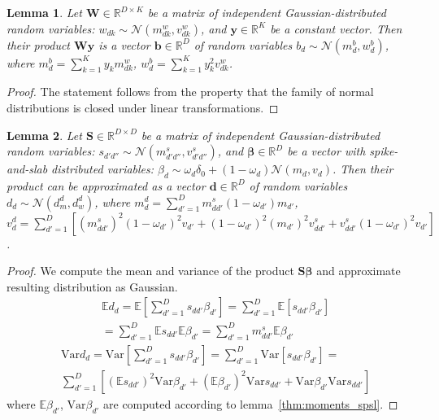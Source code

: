 \documentclass[letterpaper]{article}
\newtheorem{lemma}{Lemma}
\begin{document}
 \begin{lemma}
 \label{thm:matrix_const}
 Let $\mathbf{W} \in \mathbb{R}^{D \times K}$ be a matrix of independent Gaussian-distributed random variables: $w_{dk} \sim \mathcal{N}(m^w_{dk}, v^w_{dk})$, and $\mathbf{y} \in \mathbb{R}^K$ be a constant vector. Then their product $\mathbf{W} \mathbf{y}$ is a vector $\mathbf{b} \in \mathbb{R}^{D}$ of random variables $b_d \sim \mathcal{N}(m^b_d, w^b_d)$, where $m^b_d = \sum_{k=1}^Ky_k m^w_{dk}$, $w^b_d = \sum_{k=1}^Ky_k^2v^w_{dk}$. 
 \end{lemma}
 \begin{proof}
 	The statement follows from the property that the family of normal distributions is closed under linear transformations.
 \end{proof}
 
  \begin{lemma}
  \label{thm:matrix_vector}
 Let $\mathbf{S} \in \mathbb{R}^{D \times D}$ be a matrix of independent Gaussian-distributed random variables: $s_{d'd''} \sim \mathcal{N}(m^s_{d'd''}, v^s_{d'd''})$, and $\boldsymbol\beta \in \mathbb{R}^D$ be a vector with spike-and-slab distributed variables: $\beta_d \sim \omega_d \delta_0 + (1 - \omega_d)\mathcal{N}(m_d, v_d)$. Then their product can be approximated as a vector $\mathbf{d} \in \mathbb{R}^{D}$ of random variables $d_d \sim \mathcal{N}(d^d_m, d^d_w)$, where $m^d_d = \sum_{d'=1}^D m^s_{dd'}(1-\omega_{d'})m_{d'}$, $v^d_d = \sum_{d'=1}^D [(m^s_{dd'})^2(1-\omega_{d'})^2v_{d'} + (1-\omega_{d'})^2(m_{d'})^2v^s_{dd'} + v^s_{dd'}(1-\omega_{d'})^2v_{d'}]$.
 \end{lemma}
 \begin{proof}
 	We compute the mean and variance of the product $\mathbf{S}\boldsymbol\beta$ and approximate resulting distribution as Gaussian.
\begin{align}
	&\mathbb{E}d_d = \mathbb{E} \left[\sum_{d'=1}^D s_{dd'}\beta_{d'}\right] =  \sum_{d'=1}^D \mathbb{E}[s_{dd'}\beta_{d'}] \\
	&= \sum_{d'=1}^D \mathbb{E}s_{dd'}\mathbb{E}\beta_{d'} = \sum_{d'=1}^D m^s_{dd'}\mathbb{E}\beta_{d'}
\end{align}
\begin{align}
	&\text{Var}d_d = \text{Var} \left[\sum_{d'=1}^D s_{dd'}\beta_{d'}\right] =  \sum_{d'=1}^D \text{Var}[s_{dd'}\beta_{d'}] = \\
	&\sum_{d'=1}^D [(\mathbb{E}s_{dd'})^2 \text{Var}\beta_{d'} + (\mathbb{E}\beta_{d'})^2 \text{Var}s_{dd'} + \text{Var}\beta_{d'} \text{Var}s_{dd'}]
\end{align}
where $\mathbb{E}\beta_{d'}$, $\text{Var}\beta_{d'}$ are computed according to lemma~\ref{thm:moments_spsl}.
 \end{proof}
\end{document}
